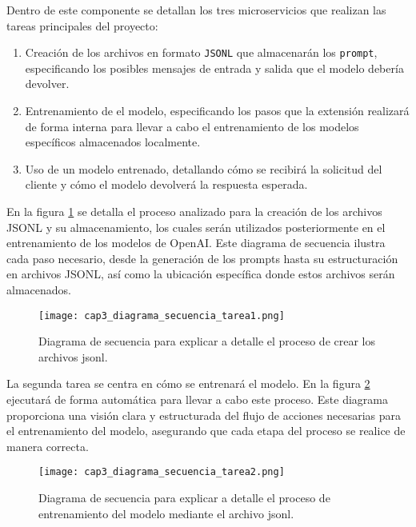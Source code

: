 \begin{itemize}
	Dentro de este componente se detallan los tres microservicios que realizan las tareas principales del proyecto:
	
	\begin{enumerate}
		\item Creación de los archivos en formato  \texttt{JSONL} que almacenarán los \texttt{prompt}, especificando los posibles mensajes de entrada y salida que el modelo debería devolver.
		\item Entrenamiento de el modelo, especificando los pasos que la extensión realizará de forma interna para llevar a cabo el entrenamiento de los modelos específicos almacenados localmente.
		\item 	Uso de un modelo entrenado, detallando cómo se recibirá la solicitud del cliente y cómo el modelo devolverá la respuesta esperada.
	\end{enumerate}
	
	En la figura \ref{fig:cap3_diagrama_secuencia_tarea1} se detalla el proceso analizado para la creación de los archivos JSONL y su almacenamiento, los cuales serán utilizados posteriormente en el entrenamiento de los modelos de OpenAI. Este diagrama de secuencia ilustra cada paso necesario, desde la generación de los prompts hasta su estructuración en archivos JSONL, así como la ubicación específica donde estos archivos serán almacenados. 
	
	\begin{figure}[H]  
		\centering
		\texttt{[image: cap3\_diagrama\_secuencia\_tarea1.png]}
		\caption{Diagrama de secuencia para explicar a detalle el proceso de crear los archivos jsonl.}
		\label{fig:cap3_diagrama_secuencia_tarea1}
	\end{figure}
	
	La segunda tarea se centra en cómo se entrenará el modelo. En la figura \ref{fig:cap3_diagrama_secuencia_tarea2} ejecutará de forma automática para llevar a cabo este proceso. Este diagrama proporciona una visión clara y estructurada del flujo de acciones necesarias para el entrenamiento del modelo, asegurando que cada etapa del proceso se realice de manera correcta.
	
	\begin{figure}[H]  
		\centering
		\texttt{[image: cap3\_diagrama\_secuencia\_tarea2.png]}
		\caption{Diagrama de secuencia para explicar a detalle el proceso de entrenamiento del modelo mediante el archivo jsonl.}
		\label{fig:cap3_diagrama_secuencia_tarea2}
	\end{figure}
	

\end{itemize}
